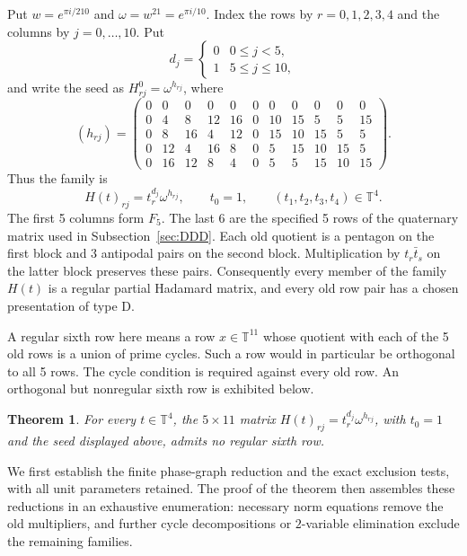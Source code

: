 \documentclass[11pt,a4paper]{article}
\newtheorem{theorem}{Theorem}[section]
\theoremstyle{plain}
\theoremstyle{definition}
\theoremstyle{plain}
\begin{document}
Put $w=e^{\pi i/210}$ and $\omega=w^{21}=e^{\pi i/10}$. Index the rows by $r=0,1,2,3,4$ and the columns by $j=0,\ldots,10$. Put
$$d_j=\begin{cases}0&0\leq j<5,\\1&5\leq j\leq10,\end{cases}$$
and write the seed as $H^0_{rj}=\omega^{h_{rj}}$, where
\[
(h_{rj})=\begin{pmatrix}
0&0&0&0&0&0&0&0&0&0&0\\
0&4&8&12&16&0&10&15&5&5&15\\
0&8&16&4&12&0&15&10&15&5&5\\
0&12&4&16&8&0&5&15&10&15&5\\
0&16&12&8&4&0&5&5&15&10&15
\end{pmatrix}.
\]
Thus the family is
\[
H(t)_{rj}=t_r^{d_j}\omega^{h_{rj}},
\qquad t_0=1,\qquad (t_1,t_2,t_3,t_4)\in\mathbb T^4.
\]
The first 5 columns form $F_5$. The last 6 are the specified 5 rows of the quaternary matrix used in Subsection~\ref{sec:DDD}. Each old quotient is a pentagon on the first block and 3 antipodal pairs on the second block. Multiplication by $t_r\bar t_s$ on the latter block preserves these pairs. Consequently every member of the family $H(t)$ is a regular partial Hadamard matrix, and every old row pair has a chosen presentation of type $\mathrm{D}$.

A regular sixth row here means a row $x\in\mathbb T^{11}$ whose quotient with each of the 5 old rows is a union of prime cycles. Such a row would in particular be orthogonal to all 5 rows. The cycle condition is required against every old row. An orthogonal but nonregular sixth row is exhibited below.

\par\addvspace{\medskipamount}\noindent
\begin{minipage}{\linewidth}
\begin{theorem}\label{n11_full:main}
For every $t\in\mathbb T^4$, the $5\times11$ matrix $H(t)_{rj}=t_r^{d_j}\omega^{h_{rj}}$, with $t_0=1$ and the seed displayed above, admits no regular sixth row.
\end{theorem}
\end{minipage}
\par\addvspace{\medskipamount}

We first establish the finite phase-graph reduction and the exact exclusion tests, with all unit parameters retained. The proof of the theorem then assembles these reductions in an exhaustive enumeration: necessary norm equations remove the old multipliers, and further cycle decompositions or $2$-variable elimination exclude the remaining families.
\end{document}
